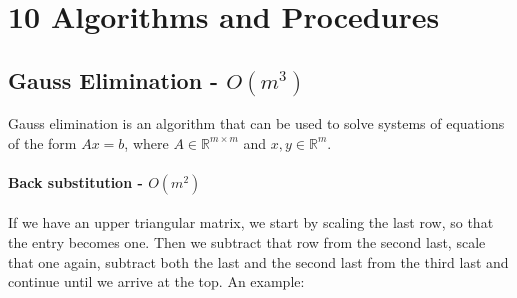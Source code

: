 \section*{10 Algorithms and Procedures}

\subsection{Gauss Elimination - \texorpdfstring{$O(m^3)$}{O(m\^3)}}

Gauss elimination is an algorithm that can be used to solve systems of
equations of the form $Ax=b$, where $A\in\mathbb{R}^{m\times m}$
and $x,y\in\mathbb{R}^m$.

\paragraph{Back substitution - $O(m^2)$} If we have an upper
triangular matrix, we start by scaling the last row, so that the
entry becomes one. Then we subtract that row from the second last,
scale that one again, subtract both the last and the second last
from the third last and continue until we arrive at the top.
An example:

\vspace{-\baselineskip}

